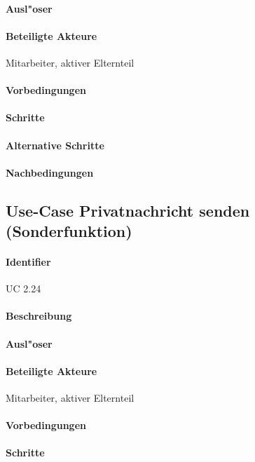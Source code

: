   \paragraph{Ausl"oser}
  \paragraph{Beteiligte Akteure}   \leavevmode \newline
    Mitarbeiter, aktiver Elternteil
  \paragraph{Vorbedingungen}
  \paragraph{Schritte}
  \paragraph{Alternative Schritte}
  \paragraph{Nachbedingungen}
  
  \newpage
 \subsection{Use-Case Privatnachricht senden (Sonderfunktion)}
  \paragraph{Identifier}
  UC 2.24
  \paragraph{Beschreibung}
  \paragraph{Ausl"oser}
  \paragraph{Beteiligte Akteure}   \leavevmode \newline
    Mitarbeiter, aktiver Elternteil
  \paragraph{Vorbedingungen}
  \paragraph{Schritte}
